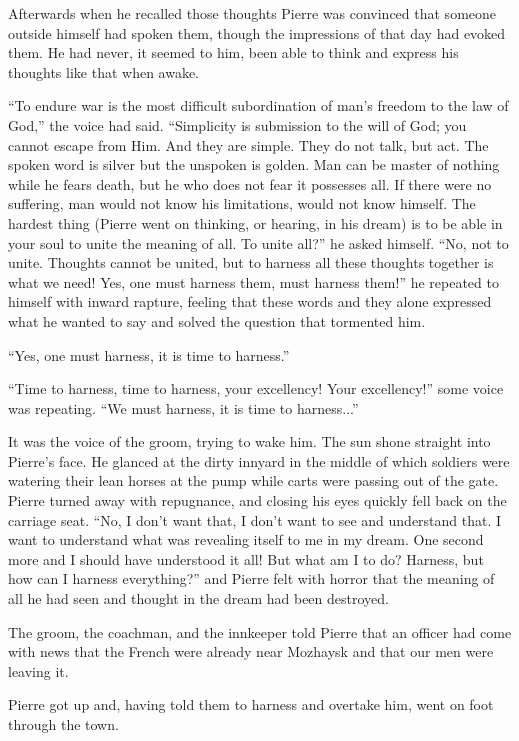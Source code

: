 Afterwards when he recalled those thoughts Pierre was convinced
that someone outside himself had spoken them, though the
impressions of that day had evoked them. He had never, it seemed
to him, been able to think and express his thoughts like that
when awake.

``To endure war is the most difficult subordination of man's
freedom to the law of God,'' the voice had said. ``Simplicity is
submission to the will of God; you cannot escape from Him. And
they are simple. They do not talk, but act. The spoken word is
silver but the unspoken is golden.  Man can be master of nothing
while he fears death, but he who does not fear it possesses
all. If there were no suffering, man would not know his
limitations, would not know himself. The hardest thing (Pierre
went on thinking, or hearing, in his dream) is to be able in your
soul to unite the meaning of all. To unite all?'' he asked
himself. ``No, not to unite. Thoughts cannot be united, but to
harness all these thoughts together is what we need! Yes, one
must harness them, must harness them!'' he repeated to himself
with inward rapture, feeling that these words and they alone
expressed what he wanted to say and solved the question that
tormented him.

``Yes, one must harness, it is time to harness.''

``Time to harness, time to harness, your excellency! Your
excellency!''  some voice was repeating. ``We must harness, it is
time to harness...''

It was the voice of the groom, trying to wake him. The sun shone
straight into Pierre's face. He glanced at the dirty innyard in
the middle of which soldiers were watering their lean horses at
the pump while carts were passing out of the gate. Pierre turned
away with repugnance, and closing his eyes quickly fell back on
the carriage seat.  ``No, I don't want that, I don't want to see
and understand that. I want to understand what was revealing
itself to me in my dream. One second more and I should have
understood it all! But what am I to do? Harness, but how can I
harness everything?'' and Pierre felt with horror that the
meaning of all he had seen and thought in the dream had been
destroyed.

The groom, the coachman, and the innkeeper told Pierre that an
officer had come with news that the French were already near
Mozhaysk and that our men were leaving it.

Pierre got up and, having told them to harness and overtake him,
went on foot through the town.

